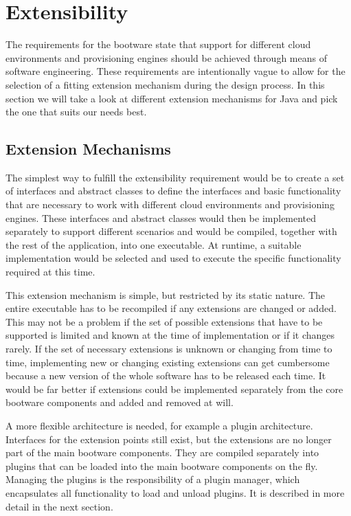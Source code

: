 \section{Extensibility}
\label{design:extensibility}

The requirements for the bootware state that support for different cloud environments and provisioning engines should be achieved through means of software engineering.
These requirements are intentionally vague to allow for the selection of a fitting extension mechanism during the design process.
In this section we will take a look at different extension mechanisms for Java and pick the one that suits our needs best.

\subsection{Extension Mechanisms}

The simplest way to fulfill the extensibility requirement would be to create a set of interfaces and abstract classes to define the interfaces and basic functionality that are necessary to work with different cloud environments and provisioning engines.
These interfaces and abstract classes would then be implemented separately to support different scenarios and would be compiled, together with the rest of the application, into one executable.
At runtime, a suitable implementation would be selected and used to execute the specific functionality required at this time.

This extension mechanism is simple, but restricted by its static nature.
The entire executable has to be recompiled if any extensions are changed or added.
This may not be a problem if the set of possible extensions that have to be supported is limited and known at the time of implementation or if it changes rarely.
If the set of necessary extensions is unknown or changing from time to time, implementing new or changing existing extensions can get cumbersome because a new version of the whole software has to be released each time.
It would be far better if extensions could be implemented separately from the core bootware components and added and removed at will.

A more flexible architecture is needed, for example a plugin architecture.
Interfaces for the extension points still exist, but the extensions are no longer part of the main bootware components.
They are compiled separately into plugins that can be loaded into the main bootware components on the fly.
Managing the plugins is the responsibility of a plugin manager, which encapsulates all functionality to load and unload plugins.
It is described in more detail in the next section.


